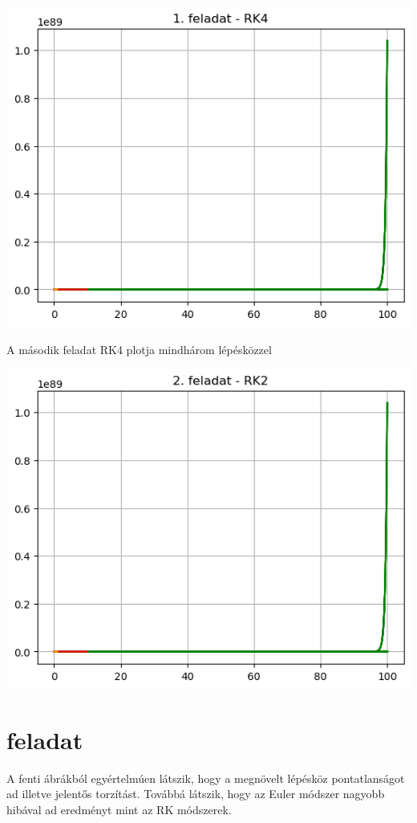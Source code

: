\documentclass{article}
\begin{document}
\includegraphics[scale=1]{../plot_11.png} 

A második feladat RK4 plotja mindhárom lépésközzel

\includegraphics[scale=1]{../plot_10.png} 

\section{feladat}

A fenti ábrákból egyértelmúen látszik, hogy a megnövelt lépésköz pontatlanságot ad illetve jelentős torzítást. Továbbá látszik, hogy az Euler módszer nagyobb hibával ad eredményt mint az RK módszerek.
\end{document}
